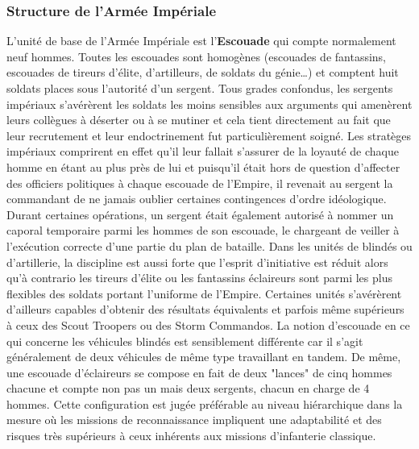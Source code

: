 \documentclass[twoside]{article}
\begin{document}
\subsubsection{Structure de l'Armée Impériale}
L'unité de base de l'Armée Impériale est l'\textbf{Escouade} qui compte normalement neuf hommes. Toutes les escouades sont homogènes (escouades de fantassins, escouades de tireurs d'élite, d'artilleurs, de soldats du génie\ldots) et comptent huit soldats places sous l'autorité d'un sergent. Tous grades confondus, les sergents impériaux s'avérèrent les soldats les moins sensibles aux arguments qui amenèrent leurs collègues à déserter ou à se mutiner et cela tient directement au fait que leur recrutement et leur endoctrinement fut particulièrement soigné. Les stratèges impériaux comprirent en effet qu'il leur fallait s'assurer de la loyauté de chaque homme en étant au plus près de lui et puisqu'il était hors de question d'affecter des officiers politiques à chaque escouade de l'Empire, il revenait au sergent la commandant de ne jamais oublier certaines contingences d'ordre idéologique. Durant certaines opérations, un sergent était également autorisé à nommer un caporal temporaire parmi les hommes de son escouade, le chargeant de veiller à l'exécution correcte d'une partie du plan de bataille. Dans les unités de blindés ou d'artillerie, la discipline est aussi forte que l'esprit d'initiative est réduit alors qu'à contrario les tireurs d'élite ou les fantassins éclaireurs sont parmi les plus flexibles des soldats portant l'uniforme de l'Empire. Certaines unités s'avérèrent d'ailleurs capables d'obtenir des résultats équivalents et parfois même supérieurs à ceux des Scout Troopers ou des Storm Commandos. La notion d'escouade en ce qui concerne les véhicules blindés est sensiblement différente car il s'agit généralement de deux véhicules de même type travaillant en tandem. De même, une escouade d'éclaireurs se compose en fait de deux "lances" de cinq hommes chacune et compte non pas un mais deux sergents, chacun en charge de 4 hommes. Cette configuration est jugée préférable au niveau hiérarchique dans la mesure où les missions de reconnaissance impliquent une adaptabilité et des risques très supérieurs à ceux inhérents aux missions d'infanterie classique.\\
\end{document}
